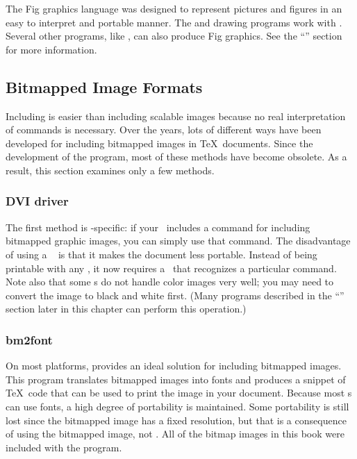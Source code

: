 The Fig graphics language was designed to represent pictures and
figures in an easy to interpret and portable manner.  
The  and
 drawing programs work with .  
Several other
programs, like , can also produce Fig graphics.
See the ``'' section for more information.

\subsection{Bitmapped Image Formats}

Including  is easier than including 
scalable images
because no real interpretation of commands is necessary.  Over the
years, lots of different ways have been developed for including
bitmapped images in \TeX\ documents.  Since the development of the
 program, most of these methods have become obsolete.
As a result, this section examines only a few methods.

\subsubsection{DVI driver }

The first method is \dvidriver-specific: if your \dvidriver\ includes
a  command for including bitmapped graphic images, you
can simply use that command.  The disadvantage of using a \dvidriver\
 is that it makes the document less portable.  Instead
of being printable with any \dvidriver, it now requires a \dvidriver\
that recognizes a particular  command.  Note also that
some \dvidriver{}s do not handle color images very well; you may need
to convert the image to black and white first. (Many programs described
in the ``\nameref{sec:picconv}'' section later in this chapter can
perform this operation.)

\subsubsection{bm2font}

On most platforms,  provides an ideal solution for
including bitmapped images.
This program
translates bitmapped images into  fonts and produces a snippet
of \TeX\ code that can be used to print the image in your document.
Because most \dvidriver{}s can use \ext{PK} fonts, a high degree of
portability is maintained.  Some portability is still lost since the
bitmapped image has a fixed resolution, but that is a consequence of using the
bitmapped image, not .  All
of the bitmap images in this book were included with the
\program{bm2font} program.  

